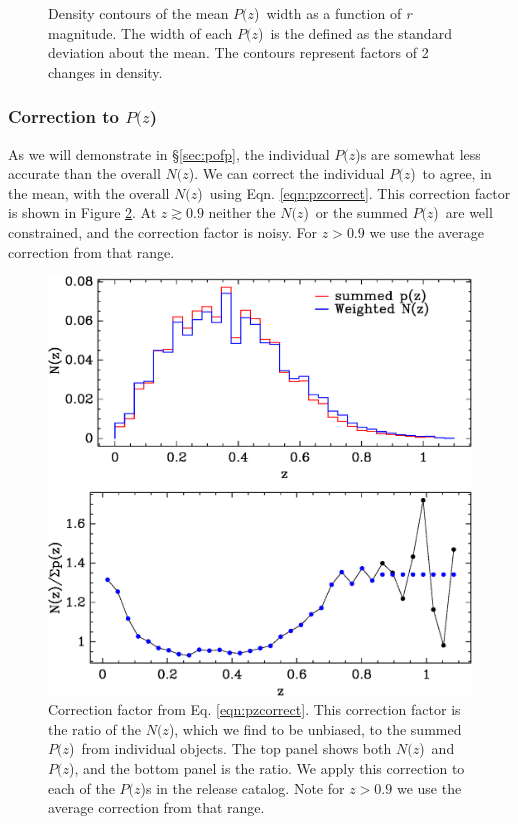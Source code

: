 \documentclass[preprint]{aastex}
\newcommand{\pofz}{$P(z$)}
\newcommand{\nofz}{$N(z$)}
\begin{document}
\begin{figure}[p]\centering
    \caption{Density contours of the mean \pofz\ width as a function of {\it r} magnitude. 
The width of each \pofz\ is the defined as the standard deviation about the mean. 
The contours represent factors of 2 changes in density.}
    \label{fig:pzwidth}
    \vspace{2em}
\end{figure}

\subsubsection{Correction to \pofz} \label{sec:pzcorr}

As we will demonstrate in \S \ref{sec:pofp}, the individual \pofz s are
somewhat less accurate than the overall \nofz.  We can correct the individual
\pofz\ to agree, in the mean, with the overall \nofz\ using Eqn.
\ref{eqn:pzcorrect}.  This correction factor is shown in Figure
\ref{fig:pzcorr}.  At $z \gtrsim 0.9$ neither the \nofz\ or the summed
\pofz\ are well constrained, and the correction factor is noisy.  For $z > 0.9$
we use the average correction from that range.

\begin{figure}[t]\centering
    \includegraphics[scale=0.6]{figures/pofz-correct-12.eps}

    \caption{Correction factor from Eq. \ref{eqn:pzcorrect}.  This correction
    factor is the ratio of the \nofz, which we find to be unbiased, to the summed
    \pofz\ from individual objects. The top panel shows both \nofz\ and \pofz,
    and the bottom panel is the ratio.  We apply this correction to each of the
    \pofz s in the release catalog.  Note for $z > 0.9$ we use the average
    correction from that range.}

    \label{fig:pzcorr}
    \vspace{2em}
\end{figure}
\end{document}
